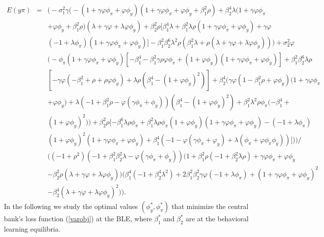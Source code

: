 \def\CTeXPreproc{Created by ctex v0.2.5, don't edit!}\documentclass[12pt]{article}
\numberwithin{equation}{section}
\begin{document}
\begin{eqnarray*}
E(y\pi)&=&\Big(-\sigma_1^2\gamma\big(-(1+\gamma\varphi\phi_\pi+\varphi\phi_y)(1+\gamma\varphi\phi_\pi+\varphi\phi_y+\beta_1^2\rho)+\beta_2^4\lambda(1+\gamma\varphi\phi_\pi\\
&&+\varphi\phi_y+\beta_1^2\rho)(\lambda+\gamma\varphi+\lambda\varphi\phi_y)+\beta_2^2\rho[\beta_1^4\lambda+\beta_1^2\lambda\rho(1+\gamma\varphi\phi_\pi+\varphi\phi_y)+\gamma\varphi\\
&&(-1+\lambda \phi_\pi)(1+\gamma\varphi\phi_\pi+\varphi\phi_y)]-\beta_1^2\beta_2^6\lambda^2\rho(\beta_1^2\lambda+\rho(\lambda+\gamma\varphi+\lambda\varphi\phi_y))\big)+\sigma_2^2\varphi\\
&&\big(-\phi_\pi(1+\gamma\varphi\phi_\pi+\varphi\phi_y)[-\beta_1^4-\beta_1^2\gamma\rho\varphi\phi_\pi+(1+\varphi\phi_y)(1+\gamma\varphi\phi_\pi+\varphi\phi_y)]+\beta_1^2\beta_2^6\lambda\rho\\
&&[-\gamma\varphi(-\beta_1^2+\rho+\rho\varphi\phi_y)+\lambda\rho(\beta_1^4-(1+\varphi\phi_y)^2)]+\beta_2^4\big(\gamma\varphi(1-\beta_1^2\rho+\varphi\phi_y)(1+\gamma\varphi\phi_\pi\\
&&+\varphi\phi_y)+\lambda(-1+\beta_1^2\rho-\varphi(\gamma\phi_\pi+\phi_y))(\beta_1^4-(1+\varphi\phi_y)^2)+\beta_1^2\lambda^2\rho\phi_\pi(-\beta_1^4+\\
&&(1+\varphi\phi_y)^2)\big)+\beta_2^2\rho[-\beta_1^6\lambda\rho\phi_\pi+\beta_1^2\lambda\rho\phi_\pi(1+\varphi\phi_y)(1+\gamma\varphi\phi_\pi+\varphi\phi_y)-(-1+\lambda\phi_\pi)\\
&&(1+\varphi\phi_y)^2(1+\gamma\varphi\phi_\pi+\varphi\phi_y)+\beta_1^4(-1-\varphi(\gamma\phi_\pi+\varphi_y)+\lambda(\phi_\pi+\varphi\phi_\pi\phi_y))]\big)\Big)\Big/  \\
&& \Big((-1+\rho^2)(-1+\beta_1^2\beta_2^2\lambda-\varphi(\gamma\phi_\pi+\phi_y))(1+\beta_1^2\rho(-1+\beta_2^2\lambda\rho)+\gamma\varphi\phi_\pi+\varphi\phi_y\\
&&-\beta_2^2\rho(\lambda+\gamma\varphi+\lambda\varphi\phi_y))\big(\beta_1^4(-1+\beta_2^4\lambda^2)+2\beta_1^2\beta_2^2\gamma\varphi(-1+\lambda\phi_\pi)+(1+\gamma\varphi\phi_\pi+\varphi\phi_y)^2\\
&&-\beta_2^4(\lambda+\gamma\varphi+\lambda\varphi\phi_y)^2\big)\Big).
\end{eqnarray*}
In the following we study the optimal values  $(\phi_y^*, \phi_\pi^*)$ that minimize the central bank's loss function (\ref{varobj}) at the BLE, where $\beta_1^*$ and $\beta_2^*$ are at the behavioral learning equilibria.
\end{document}
